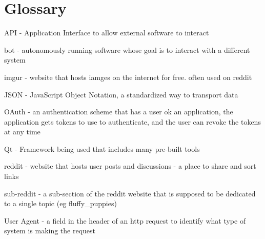 \documentclass[12pt]{article}
\begin{document}
\section{Glossary}

API - Application Interface to allow external software to interact

bot - autonomously running software whose goal is to interact with a different system

imgur - website that hosts iamges on the internet for free. often used on reddit

JSON - JavaScript Object Notation, a standardized way to transport data

OAuth - an authentication scheme that has a user ok an application, the application gets tokens to use to authenticate, and the user can revoke the tokens at any time

Qt - Framework being used that includes many pre-built tools

reddit - website that hosts user posts and discussions - a place to share and sort links

sub-reddit - a sub-section of the reddit website that is supposed to be dedicated to a single topic (eg fluffy\_puppies)

User Agent - a field in the header of an http request to identify what type of system is making the request
\end{document}
